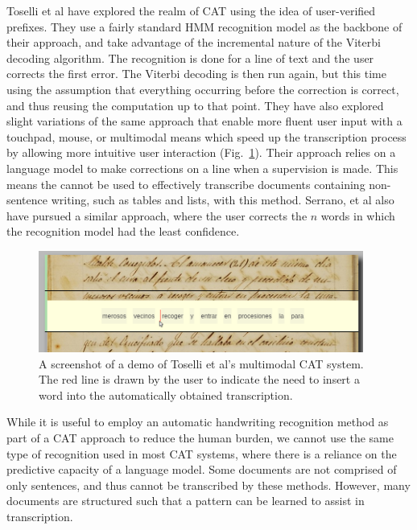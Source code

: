 \documentclass[ms]{byuprop}
\begin{document}
Toselli et al\cite{Toselli2007} have explored the realm of CAT using the idea of user-verified prefixes. They use a fairly standard HMM recognition model as the backbone of their approach, and take advantage of the incremental nature of the Viterbi decoding algorithm. The recognition is done for a line of text and the user corrects the first error. The Viterbi decoding is then run again, but this time using the assumption that everything occurring before the correction is correct, and thus reusing the computation up to that point. They have also explored slight variations of the same approach that enable more fluent user input with a touchpad\cite{Toselli2008}, mouse\cite{Toselli2009}, or multimodal means\cite{Toselli2010} which speed up the transcription process by allowing more intuitive user interaction (Fig.~\ref{fig:Toselli_multimodalCAT}). Their approach relies on a language model to make corrections on a line when a supervision is made. This means the cannot be used to effectively transcribe documents containing non-sentence writing, such as tables and lists, with this method. Serrano, et al also have pursued a similar approach, where the user corrects the $n$ words in which the recognition model had the least confidence\cite{Serrano2014}.

\begin{figure}
    \centering
    \includegraphics[width=0.95\textwidth]{Toselli_multimodalCAT}
    \caption{A screenshot of a demo of Toselli et al's multimodal CAT system. The red line is drawn by the user to indicate the need to insert a word into the automatically obtained transcription.}
    \label{fig:Toselli_multimodalCAT}
\end{figure}

While it is useful to employ an automatic handwriting recognition method as part of a CAT approach to reduce the human burden, we cannot use the same type of recognition used in most CAT systems, where there is a reliance on the predictive capacity of a language model. Some documents are not comprised of only sentences, and thus cannot be transcribed by these methods. However, many documents are structured such that a pattern can be learned to assist in transcription.
\end{document}
